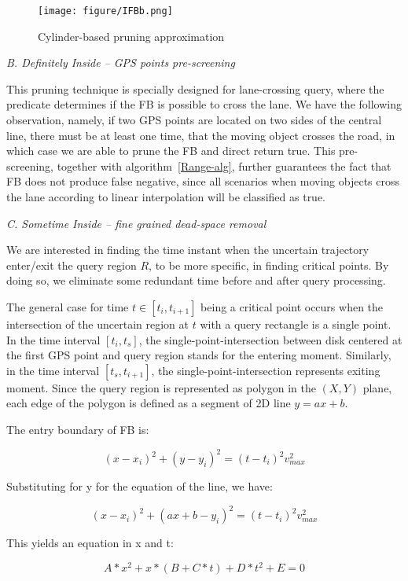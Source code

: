 \begin{figure}
    \centering
    \texttt{[image: figure/IFBb.png]}
    \caption{Cylinder-based pruning approximation}
    \label{IFBb}
\end{figure}

\noindent\textit{B. Definitely Inside -- GPS points pre-screening}

This pruning technique is specially designed for lane-crossing query, where the predicate determines if the FB is possible to cross the lane. We have the following observation, namely, if two GPS points are located on two sides
of the central line, there must be at least one time, that the moving object crosses the road, in which case we are
able to prune the FB and direct return true. This pre-screening, together with algorithm~\ref{Range-alg}, further
guarantees the fact that FB does not produce false negative, since all scenarios when moving objects cross the lane according to linear interpolation will be classified as true.

\noindent\textit{C. Sometime Inside -- fine grained dead-space removal}

We are interested in finding
the time instant when the uncertain trajectory enter/exit the query region $R$, to be
more specific, in finding critical points. By doing so, we eliminate some redundant time before and after query processing.

The general case for time $t \in [t_{i}, t_{i+1}]$
being a critical point occurs when the intersection of the uncertain region at $t$ with a query rectangle is a single point. In the time interval $[t_{i}, t_s]$, the single-point-intersection between disk centered at the first GPS point and query region stands for the entering moment. Similarly, in the time interval $[t_s, t_{i+1}]$, the single-point-intersection represents exiting moment. Since the query region is represented as polygon in the $(X,Y)$ plane, each edge of the polygon is defined as a segment of 2D line $y = ax+b$. 

The entry boundary of FB is:

$$(x - x_{i})^{2} + (y - y_{i})^{2} = (t - t_{i})^{2}v^{2}_{max}$$

Substituting for y for the equation of the line, we have:

$$(x - x_{i})^{2} + (ax+b - y_{i})^{2} = (t - t_{i})^{2}v^{2}_{max}$$

This yields an equation in x and t:

$$A*x^2+x*(B+C*t)+D*t^2+E=0$$

